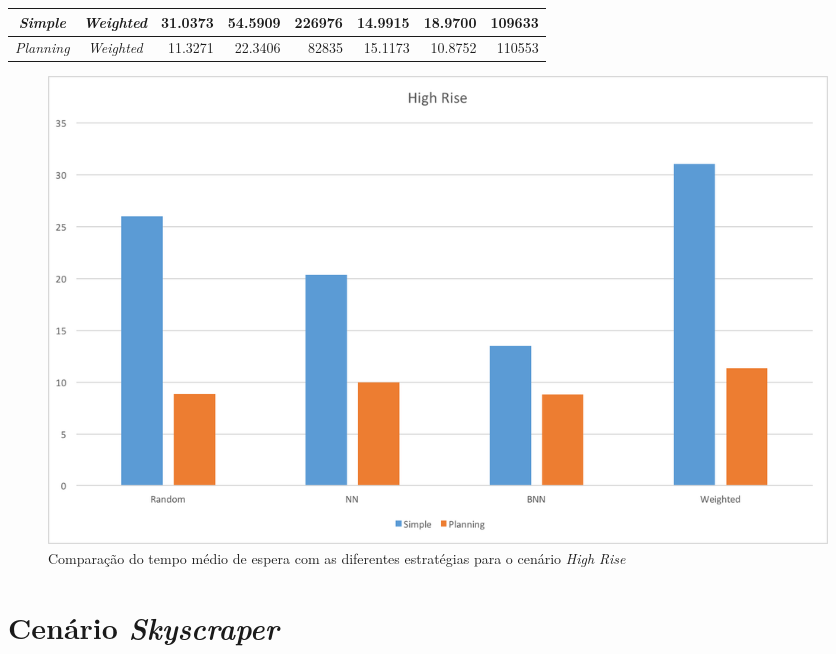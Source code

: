 \begin{table}[htb!]
\begin{tabular}{|c|c|r|r|r|r|r|r|}
\textit{Simple}      & \textit{Weighted}        & 31.0373                         & 54.5909                         & 226976                          & \cellcolor[HTML]{67FD9A}14.9915 & 18.9700                         & \cellcolor[HTML]{67FD9A}109633  \\ \hline
\textit{Planning}    & \textit{Weighted}        & 11.3271                         & 22.3406                         &  82835                          & 15.1173                         & 10.8752                         & 110553                          \\ \hline
\end{tabular}
\end{table}

\begin{figure}[htb]
  \centering
  \includegraphics[scale=0.5]{img/chart-averages-high-rise}
  \caption{Comparação do tempo médio de espera com as diferentes estratégias
    para o cenário \textit{High Rise}}
  \label{fig:result:average:high-rise}
\end{figure}

\section{Cenário \textit{Skyscraper}}

\lipsum[1]

